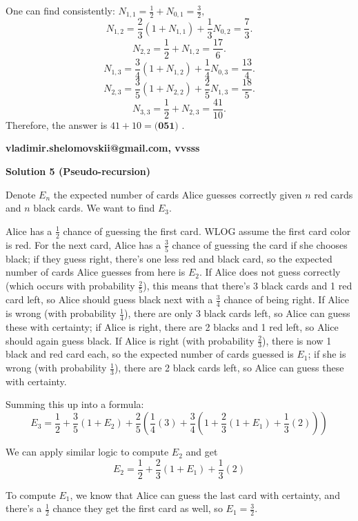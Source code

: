 \begin{enumerate}
{{ One can find consistently: $N_{1,1} = \frac {1}{2} + N_{0,1} = \frac {3}{2},$
 \[N_{1,2} = \frac {2}{3} (1 + N_{1,1}) + \frac {1}{3} N_{0,2} = \frac {7}{3}.\]
 \[N_{2,2} = \frac {1}{2} + N_{1,2} = \frac {17}{6}.\]
 \[N_{1,3} = \frac {3}{4} (1 + N_{1,2}) + \frac {1}{4} N_{0,3} = \frac {13}{4}.\]
 \[N_{2,3} = \frac {3}{5} (1 + N_{2,2}) + \frac {2}{5} N_{1,3} = \frac {18}{5}.\]
 \[N_{3,3} = \frac {1}{2} + N_{2,3} = \frac {41}{10}.\]Therefore, the answer is $41 + 10 = \boxed{\textbf{(051) }}$.

 \textbf{vladimir.shelomovskii@gmail.com, vvsss}

 



\textbf{Solution 5 (Pseudo-recursion)}

Denote $E_n$ the expected number of cards Alice guesses correctly given $n$ red cards and $n$ black cards. We want to find $E_3$.

 Alice has a $\frac{1}{2}$ chance of guessing the first card. WLOG assume the first card color is red. For the next card, Alice has a $\frac{3}{5}$ chance of guessing the card if she chooses black; if they guess right, there's one less red and black card, so the expected number of cards Alice guesses from here is $E_2$. If Alice does not guess correctly (which occurs with probability $\frac{2}{5}$), this means that there's 3 black cards and 1 red card left, so Alice should guess black next with a $\frac{3}{4}$ chance of being right. If Alice is wrong (with probability $\frac{1}{4}$), there are only 3 black cards left, so Alice can guess these with certainty; if Alice is right, there are 2 blacks and 1 red left, so Alice should again guess black. If Alice is right (with probability $\frac{2}{3}$), there is now 1 black and red card each, so the expected number of cards guessed is $E_1$; if she is wrong (with probability $\frac{1}{3}$), there are 2 black cards left, so Alice can guess these with certainty.

 Summing this up into a formula:
 \[E_3 = \frac{1}{2} + \frac{3}{5} \left(1 + E_2 \right) + \frac{2}{5} \left( \frac{1}{4}(3) + \frac{3}{4}\left(1 + \frac{2}{3}\left(1 + E_1 \right) + \frac{1}{3}(2)\right) \right)\]

 We can apply similar logic to compute $E_2$ and get
 \[E_2 = \frac{1}{2} + \frac{2}{3}(1 + E_1) + \frac{1}{3}(2)\]

 To compute $E_1$, we know that Alice can guess the last card with certainty, and there's a $\frac{1}{2}$ chance they get the first card as well, so $E_1 = \frac{3}{2}$.

}}
\end{enumerate}
